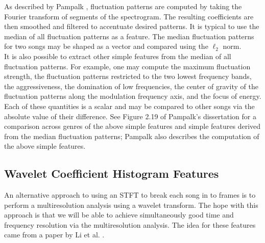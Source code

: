 \documentclass[12pt]{article}
\begin{document}
As described by Pampalk \cite{pampalk:dissertation}, fluctuation patterns are computed by taking the Fourier transform of segments of the spectrogram.  The resulting coefficients are then smoothed and filtered to accentuate desired patterns.  It is typical to use the median of all fluctuation patterns as a feature.  The median fluctuation patterns for two songs may be shaped as a vector and compared using the $\ell_2$ norm.\\

It is also possible to extract other simple features from the median of all fluctuation patterns.  For example, one may compute the maximum fluctuation strength, the fluctuation patterns restricted to the two lowest frequency bands, the aggressiveness, the domination of low frequencies, the center of gravity of the fluctuation patterns along the modulation frequency axis, and the focus of energy.  Each of these quantities is a scalar and may be compared to other songs via the absolute value of their difference.  See Figure 2.19 of Pampalk's dissertation \cite{pampalk:dissertation} for a comparison across genres of the above simple features and simple features derived from the median fluctuation patterns; Pampalk also describes the computation of the above simple features.\\


\subsection{Wavelet Coefficient Histogram Features}
An alternative approach to using an STFT to break each song in to frames is to perform a multiresolution analysis using a wavelet transform.  The hope with this approach is that we will be able to achieve simultaneously good time and frequency resolution via the multiresolution analysis.  The idea for these features came from a paper by Li et al. \cite{li:comp_study}.\\
\end{document}

